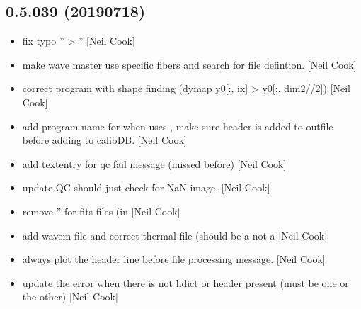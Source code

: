 \documentclass[a4paper,10pt,english]{report}
\begin{document}
\subsection{0.5.039 (2019\sphinxhyphen{}07\sphinxhyphen{}18)}
\label{\detokenize{misc/changelog:id122}}\begin{itemize}
\item {} 
 \sphinxhyphen{} fix typo ” \textendash{}\textgreater{} ” {[}Neil
Cook{]}

\item {} 
 \sphinxhyphen{} make wave master use specific fibers and search for file
defintion. {[}Neil Cook{]}

\item {} 
 \sphinxhyphen{} correct program with shape finding (dymap y0{[}:, ix{]} \textendash{}\textgreater{}
y0{[}:, dim2//2{]}) {[}Neil Cook{]}

\item {} 
 \sphinxhyphen{} add program name for when  uses
 , make sure header is added to outfile
before adding to calibDB. {[}Neil Cook{]}

\item {} 
 \sphinxhyphen{} add textentry for qc fail message (missed before)
{[}Neil Cook{]}

\item {} 
 \sphinxhyphen{} update QC should just check for NaN image.
{[}Neil Cook{]}

\item {} 
 \sphinxhyphen{} remove ” for fits files (in 
{[}Neil Cook{]}

\item {} 
 \sphinxhyphen{} add wavem file and correct thermal file (should
be a  not a  {[}Neil Cook{]}

\item {} 
 \sphinxhyphen{} always plot the header line before file processing
message. {[}Neil Cook{]}

\item {} 
 \sphinxhyphen{} update the error when there is not hdict or header
present (must be one or the other) {[}Neil Cook{]}


\end{itemize}
\end{document}

